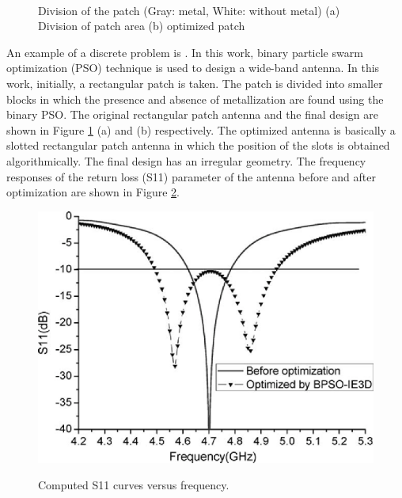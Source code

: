 \begin{figure}
  \centering
  ~~~~~~~~~~~~~~~~~~~~~
  \\
  \caption [Division of the patch (Dark: metal, White: without metal) (a) Division of patch area (b) optimized patch]{Division of the patch (Gray: metal, White: without metal) (a) Division of patch area (b) optimized patch \cite{optPatch}} \label{fig_2_2}
\end{figure}

An example of a discrete problem is \cite{optPatch}. In this work, binary particle swarm optimization (PSO) technique is used to design a wide-band antenna. In this work, initially, a rectangular patch is taken. The patch is divided into smaller blocks in which the presence and absence of metallization are found using the binary PSO. The original rectangular patch antenna and the final design are shown in Figure \ref{fig_2_2} (a) and (b) respectively. The optimized antenna is basically a slotted rectangular patch antenna in which the position of the slots is obtained algorithmically. The final design has an irregular geometry. The frequency responses of the return loss (S11) parameter of the antenna before and after optimization are shown in Figure \ref{fig_2_3}.

\begin{figure}
  \centering
  \includegraphics[width=0.6\linewidth]{fig_2_3.eps}\\
  \caption [Computed S11 curves versus frequency]{Computed S11 curves versus frequency. \cite{patch_miniaturize_ga}} \label{fig_2_3}
\end{figure}

